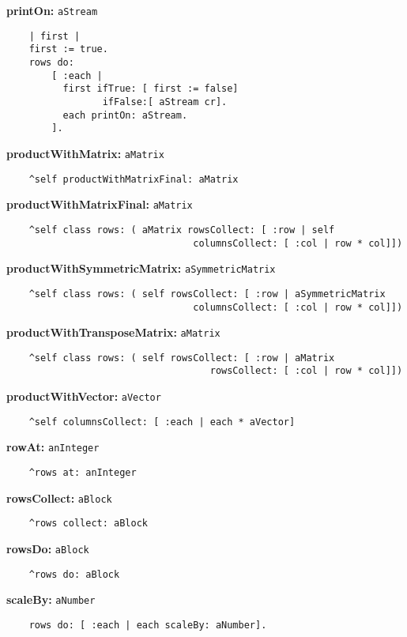 {\bf printOn:} {\tt aStream}
\begin{verbatim}
    | first |
    first := true.
    rows do: 
        [ :each |
          first ifTrue: [ first := false]
                 ifFalse:[ aStream cr].
          each printOn: aStream.
        ].

\end{verbatim}
{\bf productWithMatrix:} {\tt aMatrix}
\begin{verbatim}
    ^self productWithMatrixFinal: aMatrix

\end{verbatim}
{\bf productWithMatrixFinal:} {\tt aMatrix}
\begin{verbatim}
    ^self class rows: ( aMatrix rowsCollect: [ :row | self 
                                 columnsCollect: [ :col | row * col]])

\end{verbatim}
{\bf productWithSymmetricMatrix:} {\tt aSymmetricMatrix}
\begin{verbatim}
    ^self class rows: ( self rowsCollect: [ :row | aSymmetricMatrix 
                                 columnsCollect: [ :col | row * col]])

\end{verbatim}
{\bf productWithTransposeMatrix:} {\tt aMatrix}
\begin{verbatim}
    ^self class rows: ( self rowsCollect: [ :row | aMatrix 
                                    rowsCollect: [ :col | row * col]])

\end{verbatim}
{\bf productWithVector:} {\tt aVector}
\begin{verbatim}
    ^self columnsCollect: [ :each | each * aVector]

\end{verbatim}
{\bf rowAt:} {\tt anInteger}
\begin{verbatim}
    ^rows at: anInteger

\end{verbatim}
{\bf rowsCollect:} {\tt aBlock}
\begin{verbatim}
    ^rows collect: aBlock

\end{verbatim}
{\bf rowsDo:} {\tt aBlock}
\begin{verbatim}
    ^rows do: aBlock

\end{verbatim}
{\bf scaleBy:} {\tt aNumber}
\begin{verbatim}
    rows do: [ :each | each scaleBy: aNumber].

\end{verbatim}
